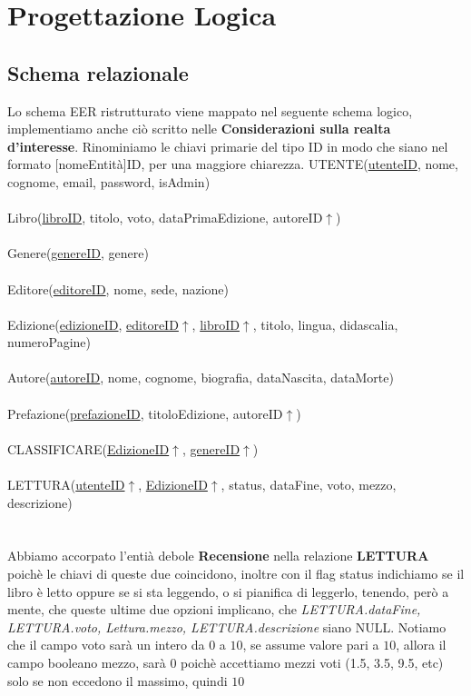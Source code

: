 \documentclass{article}
\begin{document}
\section{Progettazione Logica}
\subsection{Schema relazionale}
Lo schema EER ristrutturato viene mappato nel seguente schema logico, implementiamo anche
ciò scritto nelle \textbf{Considerazioni sulla realta d'interesse}.
Rinominiamo le chiavi primarie del tipo ID in modo che siano nel formato [nomeEntità]ID, per una maggiore chiarezza.
\newline \newline
UTENTE(\underline{utenteID}, nome, cognome, email, password, isAdmin)\\\\
Libro(\underline{libroID}, titolo, voto, dataPrimaEdizione, autoreID$\uparrow$)\\\\
Genere(\underline{genereID}, genere)\\\\
Editore(\underline{editoreID}, nome, sede, nazione)\\\\
Edizione(\underline{edizioneID}, \underline{editoreID}$\uparrow$, \underline{libroID}$\uparrow$, titolo, lingua, didascalia, numeroPagine)\\\\
Autore(\underline{autoreID}, nome, cognome, biografia, dataNascita, dataMorte)\\\\
Prefazione(\underline{prefazioneID}, titoloEdizione, autoreID$\uparrow$)\\\\
CLASSIFICARE(\underline{EdizioneID}$\uparrow$, \underline{genereID}$\uparrow$)\\\\
LETTURA(\underline{utenteID}$\uparrow$, \underline{EdizioneID}$\uparrow$, status, dataFine, voto, mezzo, descrizione)\\\\
\noindent
\\
Abbiamo accorpato l'entià debole \textbf{Recensione} nella relazione \textbf{LETTURA} poichè le chiavi di queste due coincidono, inoltre con il flag status indichiamo se il libro è letto oppure se si sta leggendo, o si pianifica di leggerlo, tenendo, però a mente,
che queste ultime due opzioni implicano, che \textit{LETTURA.dataFine, LETTURA.voto, Lettura.mezzo, LETTURA.descrizione} siano NULL.
Notiamo che il campo voto sarà un intero da $0$ a $10$, se assume valore pari a $10$, allora il campo booleano mezzo, sarà $0$
poichè accettiamo mezzi voti (1.5, 3.5, 9.5, etc) solo se non eccedono il massimo, quindi  $10$
\end{document}
